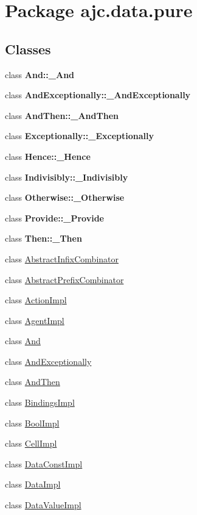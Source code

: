 \hypertarget{package__ajc_8data_8pure}{
\section{Package ajc.data.pure}
\label{package__ajc_8data_8pure}
}
\subsection*{Classes}
\begin{CompactItemize}
\item 
class {\bf And::\_\-And}
\item 
class {\bf And\-Exceptionally::\_\-And\-Exceptionally}
\item 
class {\bf And\-Then::\_\-And\-Then}
\item 
class {\bf Exceptionally::\_\-Exceptionally}
\item 
class {\bf Hence::\_\-Hence}
\item 
class {\bf Indivisibly::\_\-Indivisibly}
\item 
class {\bf Otherwise::\_\-Otherwise}
\item 
class {\bf Provide::\_\-Provide}
\item 
class {\bf Then::\_\-Then}
\item 
class \hyperlink{classAbstractInfixCombinator}{Abstract\-Infix\-Combinator}
\item 
class \hyperlink{classAbstractPrefixCombinator}{Abstract\-Prefix\-Combinator}
\item 
class \hyperlink{classActionImpl}{Action\-Impl}
\item 
class \hyperlink{classAgentImpl}{Agent\-Impl}
\item 
class \hyperlink{classAnd}{And}
\item 
class \hyperlink{classAndExceptionally}{And\-Exceptionally}
\item 
class \hyperlink{classAndThen}{And\-Then}
\item 
class \hyperlink{classBindingsImpl}{Bindings\-Impl}
\item 
class \hyperlink{classBoolImpl}{Bool\-Impl}
\item 
class \hyperlink{classCellImpl}{Cell\-Impl}
\item 
class \hyperlink{classDataConstImpl}{Data\-Const\-Impl}
\item 
class \hyperlink{classDataImpl}{Data\-Impl}
\item 
class \hyperlink{classDataValueImpl}{Data\-Value\-Impl}

\end{CompactItemize}
